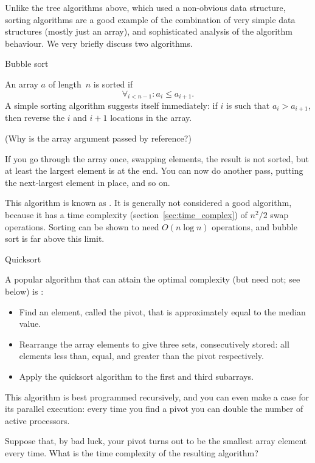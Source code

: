 Unlike the tree algorithms above, which used a non-obvious data
structure,
sorting algorithms are a good example of the combination of very
simple data structures (mostly just an array), and sophisticated
analysis of the algorithm behaviour. We very briefly discuss two
algorithms.

 {Bubble sort}

An array $a$ of length~$n$ is sorted if
\[ \forall_{i<n-1}\colon a_i\leq a_{i+1}. \]
A simple sorting algorithm suggests itself immediately: if $i$ is such
that $a_i>a_{i+1}$, then reverse the $i$ and $i+1$ locations in the
array.


(Why is the array argument passed by reference?)

If you go through the array once, swapping elements, the result is not
sorted, but at least the largest element is at the end. You can now do
another pass, putting the next-largest element in place, and so on.

This algorithm is known as . It is generally
not considered a good algorithm, because it has a time complexity
(section~\ref{sec:time_complex}) of $n^2/2$ swap operations. Sorting
can be shown to need $O(n\log n)$ operations, and bubble sort is far
above this limit.

 {Quicksort}

A popular algorithm that can attain the optimal complexity (but need
not; see below) is :
\begin{itemize}
\item Find an element, called the pivot, that is approximately equal
  to the median value.
\item Rearrange the array elements to give three sets, consecutively
  stored: all elements less than, equal, and greater than the pivot
  respectively.
\item Apply the quicksort algorithm to the first and third subarrays.
\end{itemize}

This algorithm is best programmed recursively, and you can even make a
case for its parallel execution: every time you find a pivot you can
double the number of active processors.

\begin{exercise}
  Suppose that, by bad luck, your pivot turns out to be the smallest
  array element every time. What is the time complexity of the
  resulting algorithm?
\end{exercise}

